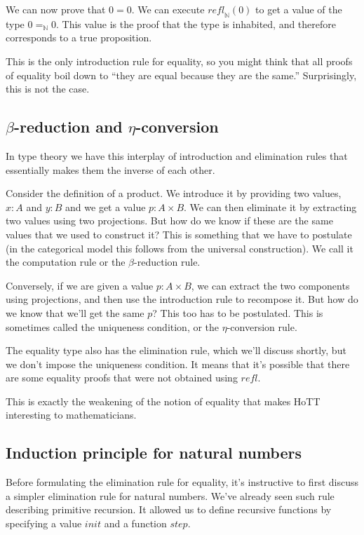 \documentclass[DaoFP]{subfiles}
\begin{document}
We can now prove that $0=0$. We can execute $\mathit{refl}_{\mathbb{N}} (0)$ to get a value of the type $0 =_{\mathbb{N}} 0$. This value is the proof that the type is inhabited, and therefore corresponds to a true proposition.

This is the only introduction rule for equality, so you might think that all proofs of equality boil down to ``they are equal because they are the same.'' Surprisingly, this is not the case. 

\subsection{$\beta$-reduction and $\eta$-conversion}

In type theory we have this interplay of introduction and elimination rules that essentially makes them the inverse of each other. 

Consider the definition of a product. We introduce it by providing two values, $x \colon A$ and $y \colon B$ and we get a value $p \colon A \times B$. We can then eliminate it by extracting two values using two projections. But how do we know if these are the same values that we used to construct it? This is something that we have to postulate (in the categorical model this follows from the universal construction). We call it the computation rule or the $\beta$-reduction rule.

Conversely, if we are given a value $p \colon A \times B$, we can extract the two components using projections, and then use the introduction rule to recompose it. But how do we know that we'll get the same $p$? This too has to be postulated. This is sometimes called the uniqueness condition, or the $\eta$-conversion rule.

The equality type also has the elimination rule, which we'll discuss shortly, but we don't impose the uniqueness condition. It means that it's possible that there are some equality proofs that were not obtained using $\mathit{refl}$. 

This is exactly the weakening of the notion of equality that makes HoTT interesting to mathematicians.

\subsection{Induction principle for natural numbers}

Before formulating the elimination rule for equality, it's instructive to first discuss a simpler elimination rule for natural numbers. We've already seen such rule describing primitive recursion. It allowed us to define recursive functions by specifying a value $\mathit{init}$ and a function $\mathit{step}$.
\end{document}
